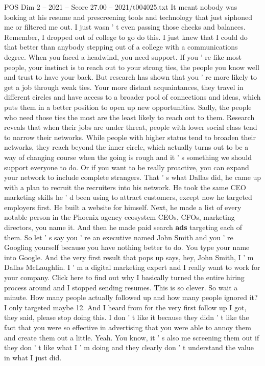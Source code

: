 \begin{textsample}{POS Dim 2 – 2021 – Score 27.00 – 2021/t004025.txt}
It meant nobody was looking at his resume and prescreening tools and technology that just siphoned me or filtered me out.
I just wasn ' t even passing those checks and balances.
Remember, I dropped out of college to go do this.
I just knew that I could do that better than anybody stepping out of a college with a communications degree.
When you faced a headwind, you need support.
If you ' re like most people, your instinct is to reach out to your strong ties, the people you know well and trust to have your back.
But research has shown that you ' re more likely to get a job through weak ties.
Your more distant acquaintances, they travel in different circles and have access to a broader pool of connections and ideas, which puts them in a better position to open up new opportunities.
Sadly, the people who need those ties the most are the least likely to reach out to them.
Research reveals that when their jobs are under threat, people with lower social class tend to narrow their networks.
While people with higher status tend to broaden their networks, they reach beyond the inner circle, which actually turns out to be a way of changing course when the going is rough and it ' s something we should support everyone to do.
Or if you want to be really proactive, you can expand your network to include complete strangers.
That ' s what Dallas did, he came up with a plan to recruit the recruiters into his network.
He took the same CEO marketing skills he ' d been using to attract customers, except now he targeted employers first.
He built a website for himself.
Next, he made a list of every notable person in the Phoenix agency ecosystem CEOs, CFOs, marketing directors, you name it.
And then he made paid search \textbf{ads} targeting each of them.
So let ' s say you ' re an executive named John Smith and you ' re Googling yourself because you have nothing better to do.
You type your name into Google.
And the very first result that pops up says, hey, John Smith, I ' m Dallas McLaughlin.
I ' m a digital marketing expert and I really want to work for your company.
Click here to find out why I basically turned the entire hiring process around and I stopped sending resumes.
This is so clever.
So wait a minute.
How many people actually followed up and how many people ignored it?
I only targeted maybe 12.
And I heard from for the very first follow up I got, they said, please stop doing this.
I don ' t like it because they didn ' t like the fact that you were so effective in advertising that you were able to annoy them and create them out a little.
Yeah.
You know, it ' s also me screening them out if they don ' t like what I ' m doing and they clearly don ' t understand the value in what I just did.

\end{textsample}
